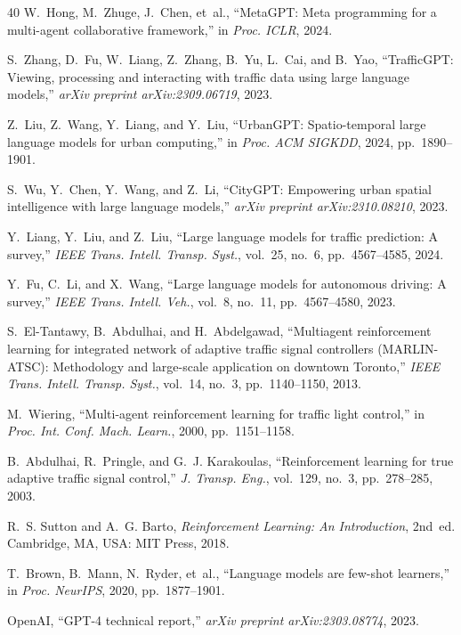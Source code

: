 \documentclass[conference]{IEEEtran}
\begin{document}
\begin{thebibliography}{40}
W.~Hong, M.~Zhuge, J.~Chen, et~al., ``MetaGPT: Meta programming for a multi-agent collaborative framework,'' in \emph{Proc. ICLR}, 2024.

S.~Zhang, D.~Fu, W.~Liang, Z.~Zhang, B.~Yu, L.~Cai, and B.~Yao, ``TrafficGPT: Viewing, processing and interacting with traffic data using large language models,'' \emph{arXiv preprint arXiv:2309.06719}, 2023.

Z.~Liu, Z.~Wang, Y.~Liang, and Y.~Liu, ``UrbanGPT: Spatio-temporal large language models for urban computing,'' in \emph{Proc. ACM SIGKDD}, 2024, pp.~1890--1901.

S.~Wu, Y.~Chen, Y.~Wang, and Z.~Li, ``CityGPT: Empowering urban spatial intelligence with large language models,'' \emph{arXiv preprint arXiv:2310.08210}, 2023.

Y.~Liang, Y.~Liu, and Z.~Liu, ``Large language models for traffic prediction: A survey,'' \emph{IEEE Trans. Intell. Transp. Syst.}, vol.~25, no.~6, pp.~4567--4585, 2024.

Y.~Fu, C.~Li, and X.~Wang, ``Large language models for autonomous driving: A survey,'' \emph{IEEE Trans. Intell. Veh.}, vol.~8, no.~11, pp.~4567--4580, 2023.

S.~El-Tantawy, B.~Abdulhai, and H.~Abdelgawad, ``Multiagent reinforcement learning for integrated network of adaptive traffic signal controllers (MARLIN-ATSC): Methodology and large-scale application on downtown Toronto,'' \emph{IEEE Trans. Intell. Transp. Syst.}, vol.~14, no.~3, pp.~1140--1150, 2013.

M.~Wiering, ``Multi-agent reinforcement learning for traffic light control,'' in \emph{Proc. Int. Conf. Mach. Learn.}, 2000, pp.~1151--1158.

B.~Abdulhai, R.~Pringle, and G.~J. Karakoulas, ``Reinforcement learning for true adaptive traffic signal control,'' \emph{J. Transp. Eng.}, vol.~129, no.~3, pp.~278--285, 2003.

R.~S. Sutton and A.~G. Barto, \emph{Reinforcement Learning: An Introduction}, 2nd~ed. Cambridge, MA, USA: MIT Press, 2018.

T.~Brown, B.~Mann, N.~Ryder, et~al., ``Language models are few-shot learners,'' in \emph{Proc. NeurIPS}, 2020, pp.~1877--1901.

OpenAI, ``GPT-4 technical report,'' \emph{arXiv preprint arXiv:2303.08774}, 2023.

\end{thebibliography}
\end{document}
